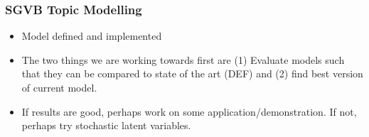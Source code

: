 \documentclass{beamer}
\date{\today} %
\begin{document}
\begin{frame}
\frametitle{SGVB Topic Modelling}
\begin{itemize}
\item{Model defined and implemented}
\item{The two things we are working towards first are (1) Evaluate models such that they can be compared to state of the art (DEF) and (2) find best version of current model.}
\item{If results are good, perhaps work on some application/demonstration. If not, perhaps try stochastic latent variables.}
\end{itemize}

\end{frame}
\end{document}
